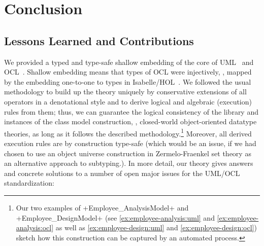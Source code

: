 
\chapter{Conclusion}

\section{Lessons Learned and Contributions}
We provided a typed and type-safe shallow embedding of the core of
UML~\cite{omg:uml-infrastructure:2011,omg:uml-superstructure:2011} and
OCL~\cite{omg:ocl:2012}. Shallow embedding means that types of OCL
were injectively, \ie, mapped by the embedding one-to-one to types in
Isabelle/HOL~\cite{nipkow.ea:isabelle:2002}.  We followed the usual
methodology to build up the theory uniquely by conservative extensions
of all operators in a denotational style and to derive logical and
algebraic (execution) rules from them; thus, we can guarantee the
logical consistency of the library and instances of the class model
construction, \ie, closed-world object-oriented datatype theories, as
long as it follows the described methodology.\footnote{Our two
  examples of \inlineisar+Employee_AnalysisModel+ and
  \inlineisar+Employee_DesignModel+ (see
  \autoref{ex:employee-analysis:uml} and
  \autoref{ex:employee-analysis:ocl} as well as
  \autoref{ex:employee-design:uml} and
  \autoref{ex:employee-design:ocl}) sketch how this construction can
  be captured by an automated process.}  Moreover, all derived
execution rules are by construction type-safe (which would be an
issue, if we had chosen to use an object universe construction in
Zermelo-Fraenkel set theory as an alternative approach to subtyping.).
In more detail, our theory gives answers and concrete solutions to a
number of open major issues for the UML/OCL standardization:
